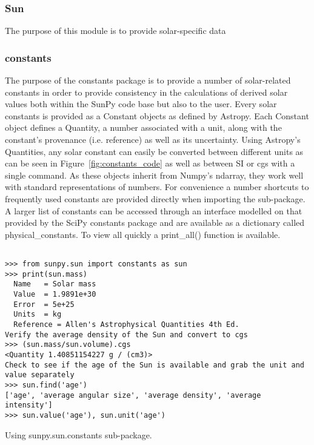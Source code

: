 \subsubsection{Sun}
The purpose of this module is to provide solar-specific data

\subsubsection{constants}
The purpose of the constants package is to provide a number of solar-related constants 
in order to provide consistency in the calculations of derived solar values both within the
SunPy code base but also to the user. Every solar constants is provided as a Constant objects as defined by Astropy. 
Each Constant object defines a Quantity, a number associated with a unit, along with the constant's provenance
(i.e. reference) as well as its uncertainty. Using Astropy's Quantities, any solar constant
can easily be converted between different units as can be seen in Figure~\ref{fig:constants_code} as well
as between SI or cgs with a single command.  As these objects inherit from Numpy's ndarray,
they work well with standard representations of numbers.
For convenience a number shortcuts to frequently used constants are provided directly when importing
the sub-package. A larger list of constants can be accessed through an interface modelled 
on that provided by the SciPy constants package and are available as a dictionary called
physical_constants. To view all quickly a print_all() function is available.

\begin{listing}[h]
\begin{verbatim}

>>> from sunpy.sun import constants as sun
>>> print(sun.mass)
  Name   = Solar mass
  Value  = 1.9891e+30
  Error  = 5e+25
  Units  = kg
  Reference = Allen's Astrophysical Quantities 4th Ed.
Verify the average density of the Sun and convert to cgs
>>> (sun.mass/sun.volume).cgs
<Quantity 1.40851154227 g / (cm3)>
Check to see if the age of the Sun is available and grab the unit and value separately
>>> sun.find('age')
['age', 'average angular size', 'average density', 'average intensity']
>>> sun.value('age'), sun.unit('age')

\end{verbatim}
\caption{Using sunpy.sun.constants sub-package.}
\label{code:constants_code}
\end{listing}
	